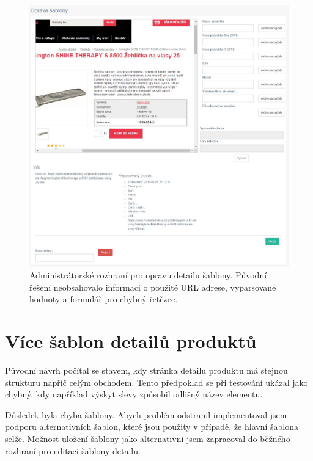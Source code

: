 \documentclass[thesis=B,czech]{FITthesis}[2012/06/26]
\begin{document}
\begin{figure}\centering
 	\includegraphics[width=1.0\textwidth]{resources/template-detail-err}
	\caption[Administrátorské rozhraní pro opravu detailu šablony]{Administrátorské rozhraní pro opravu detailu šablony.
	Původní řešení neobsahovalo informaci o použité URL adrese, vyparsované hodnoty a formulář pro chybný řetězec.}\label{fig:temp-det-err}
\end{figure}

\section{Více šablon detailů produktů}
Původní návrh počítal se stavem, kdy stránka detailu produktu  má stejnou strukturu napříč celým obchodem.
Tento předpoklad se při testování ukázal jako chybný, kdy například výskyt slevy způsobil odlišný název elementu.
\par
Důsledek byla chyba šablony. Abych problém odstranil implementoval jsem podporu alternativních šablon, které jsou
použity v případě, že hlavní šablona selže. Možnost uložení šablony jako alternativní jsem zapracoval do běžného rozhraní 
pro editaci šablony detailu.
\end{document}
